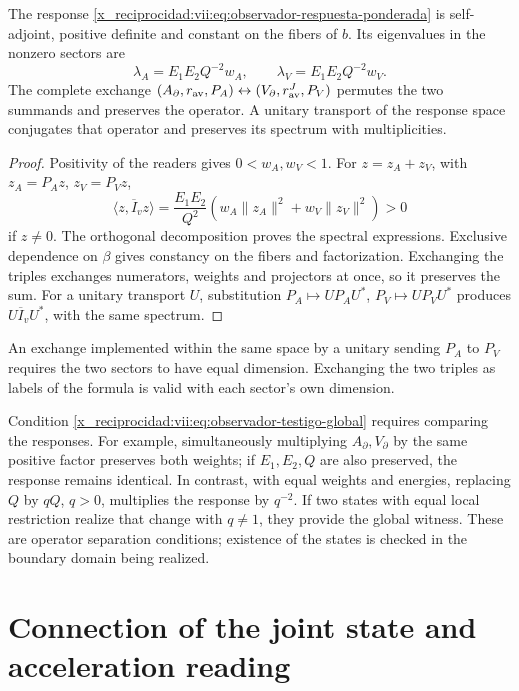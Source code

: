 \begin{proposition}
\label{x_reciprocidad:vii:prop:observador-respuesta-positiva}
The response \eqref{x_reciprocidad:vii:eq:observador-respuesta-ponderada} is
self-adjoint, positive definite and constant on the fibers of \(b\).
Its eigenvalues in the nonzero sectors are
\[
 \lambda_A=E_1E_2Q^{-2}w_A,\qquad
 \lambda_V=E_1E_2Q^{-2}w_V.
\]
The complete exchange
\((A_\partial,r_{\rm av},P_A)
 \leftrightarrow(V_\partial,r_{\rm av}^{J},P_V)\)
permutes the two summands and preserves the operator. A unitary
transport of the response space conjugates that operator and preserves
its spectrum with multiplicities.
\end{proposition}

\begin{proof}
Positivity of the readers gives \(0<w_A,w_V<1\). For
\(z=z_A+z_V\), with \(z_A=P_Az\), \(z_V=P_Vz\),
\[
 \langle z,\overline I_vz\rangle
 =\frac{E_1E_2}{Q^2}
   (w_A\|z_A\|^2+w_V\|z_V\|^2)>0
\]
if \(z\neq0\). The orthogonal decomposition proves the spectral
expressions. Exclusive dependence on \(\beta\) gives constancy
on the fibers and factorization. Exchanging the triples
exchanges numerators, weights and projectors at once, so it
preserves the sum. For a unitary transport \(U\), substitution
\(P_A\mapsto UP_AU^*\), \(P_V\mapsto UP_VU^*\) produces
\(U\overline I_vU^*\), with the same spectrum.
\end{proof}

An exchange implemented within the same space by a unitary
sending \(P_A\) to \(P_V\) requires the two sectors to have
equal dimension. Exchanging the two triples as labels of the
formula is valid with each sector's own dimension.

Condition \eqref{x_reciprocidad:vii:eq:observador-testigo-global} requires comparing
the responses. For example, simultaneously multiplying
\(A_\partial,V_\partial\) by the same positive factor preserves
both weights; if \(E_1,E_2,Q\) are also preserved, the response
remains identical. In contrast, with equal weights and energies, replacing
\(Q\) by \(qQ\), \(q>0\), multiplies the response by \(q^{-2}\).
If two states with equal local restriction realize that change with
\(q\neq1\), they provide the global witness. These are operator
separation conditions; existence of the states is checked
in the boundary domain being realized.

\section{Connection of the joint state and acceleration reading}
\label{x_reciprocidad:vii:sec:observador-autoinercia}

